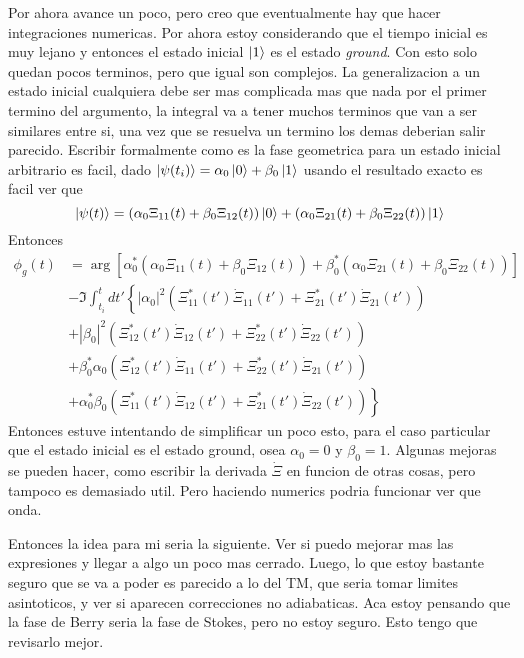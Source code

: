 Por ahora avance un poco, pero creo que eventualmente hay que hacer integraciones numericas. Por ahora estoy considerando que el tiempo inicial es muy lejano y entonces el estado inicial $\ket{1}$ es el estado \textit{ground}. Con esto solo quedan pocos terminos, pero que igual son complejos. La generalizacion a un estado inicial cualquiera debe ser mas complicada mas que nada por el primer termino del argumento, la integral va a tener muchos terminos que van a ser similares entre si, una vez que se resuelva un termino los demas deberian salir parecido. 
Escribir formalmente como es la fase geometrica para un estado inicial arbitrario es facil, dado $\ket{\psi(t_i)}=\alpha_0\ket{0}+\beta_0\ket{1}$ usando el resultado exacto es facil ver que 
\begin{equation}
    \ket{\psi(t)} = (\alpha_0\Xi_{11}(t)+\beta_0\Xi_{12}(t))\ket{0} + (\alpha_0\Xi_{21}(t)+\beta_0\Xi_{22}(t))\ket{1}
\end{equation}
Entonces 
\begin{equation}
    \begin{aligned}
        \phi_g(t) &= \arg[\alpha_0^*(\alpha_0\Xi_{11}(t)+\beta_0\Xi_{12}(t)) + \beta_0^*(\alpha_0\Xi_{21}(t)+\beta_0\Xi_{22}(t))] \\
    & - \Im \int_{t_i}^{t} dt' \left\{ |\alpha_0|^2(\Xi_{11}^*(t')\dot{\Xi}_{11}(t')+\Xi_{21}^*(t')\dot{\Xi}_{21}(t')) \right. \\
    &+ |\beta_0|^2(\Xi_{12}^*(t')\dot{\Xi}_{12}(t')+\Xi_{22}^*(t')\dot{\Xi}_{22}(t')) \\
    & +\beta_0^*\alpha_0(\Xi_{12}^*(t')\dot{\Xi}_{11}(t')+\Xi_{22}^*(t')\dot{\Xi}_{21}(t')) \\
    & \left. + \alpha_0^*\beta_0(\Xi_{11}^*(t')\dot{\Xi}_{12}(t')+\Xi_{21}^*(t')\dot{\Xi}_{22}(t')) \right\}
    \end{aligned}
\end{equation}
Entonces estuve intentando de simplificar un poco esto, para el caso particular que el estado inicial es el estado ground, osea $\alpha_0=0$ y $\beta_0=1$. Algunas mejoras se pueden hacer, como escribir la derivada $\dot \Xi$ en funcion de otras cosas, pero tampoco es demasiado util. Pero haciendo numerics podria funcionar ver que onda. 

Entonces la idea para mi seria la siguiente. Ver si puedo mejorar mas las expresiones y llegar a algo un poco mas cerrado. Luego, lo que estoy bastante seguro que se va a poder es parecido a lo del TM, que seria tomar limites asintoticos, y ver si aparecen correcciones no adiabaticas. Aca estoy pensando que la fase de Berry seria la fase de Stokes, pero no estoy seguro. Esto tengo que revisarlo mejor.

